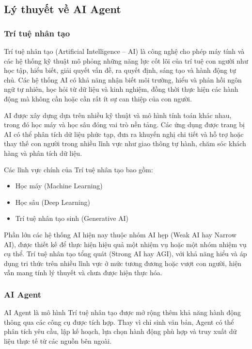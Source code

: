 \subsection{Lý thuyết về AI Agent}
\subsubsection{Trí tuệ nhân tạo}
Trí tuệ nhân tạo (Artificial Intelligence – AI) là công nghệ cho phép máy tính và các hệ thống kỹ thuật mô phỏng những năng lực cốt lõi của trí tuệ con người như học tập, hiểu biết, giải quyết vấn đề, ra quyết định, sáng tạo và hành động tự chủ. Các hệ thống AI có khả năng nhận biết môi trường, hiểu và phản hồi ngôn ngữ tự nhiên, học hỏi từ dữ liệu và kinh nghiệm, đồng thời thực hiện các hành động mà không cần hoặc cần rất ít sự can thiệp của con người\cite{c4-ai}.

AI được xây dựng dựa trên nhiều kỹ thuật và mô hình tính toán khác nhau, trong đó học máy và học sâu đóng vai trò nền tảng. Các ứng dụng được trang bị AI có thể phân tích dữ liệu phức tạp, đưa ra khuyến nghị chi tiết và hỗ trợ hoặc thay thế con người trong nhiều lĩnh vực như giao thông tự hành, chăm sóc khách hàng và phân tích dữ liệu\cite{c4-ai}.

Các lĩnh vực chính của Trí tuệ nhân tạo bao gồm:
\begin{itemize}
    \item Học máy (Machine Learning)
    \item Học sâu (Deep Learning)
    \item Trí tuệ nhân tạo sinh (Generative AI)
\end{itemize}

Phần lớn các hệ thống AI hiện nay thuộc nhóm AI hẹp (Weak AI hay Narrow AI), được thiết kế để thực hiện hiệu quả một nhiệm vụ hoặc một nhóm nhiệm vụ cụ thể. Trí tuệ nhân tạo tổng quát (Strong AI hay AGI), với khả năng hiểu và áp dụng tri thức trên nhiều lĩnh vực ở mức tương đương hoặc vượt con người, hiện vẫn mang tính lý thuyết và chưa được hiện thực hóa\cite{c4-ai}.


\subsubsection{AI Agent}
AI Agent là mô hình Trí tuệ nhân tạo được mở rộng thêm khả năng hành động thông qua các công cụ được tích hợp. Thay vì chỉ sinh văn bản, Agent có thể phân tích yêu cầu, lập kế hoạch, lựa chọn hành động phù hợp và truy xuất dữ liệu thực tế từ các nguồn bên ngoài\cite{c4-agent}.

